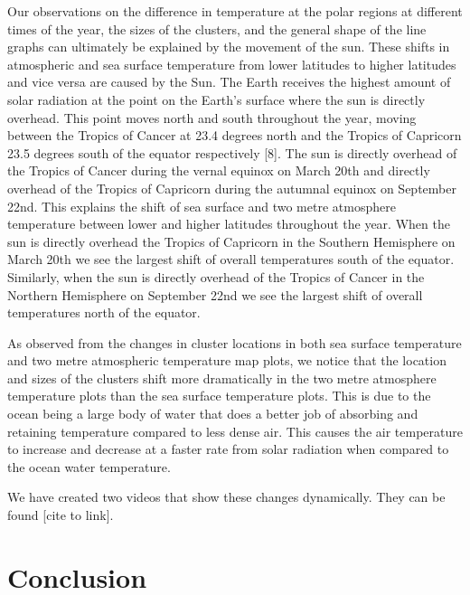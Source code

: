 \documentclass[conference,compsoc]{IEEEtran}
\begin{document}
Our observations on the difference in temperature at the polar regions at different times of the year, the sizes of the clusters, and the general shape of the line graphs can ultimately be explained by the movement of the sun. These shifts in atmospheric and sea surface temperature from lower latitudes to higher latitudes and vice versa are caused by the Sun. The Earth receives the highest amount of solar radiation at the point on the Earth's surface where the sun is directly overhead. This point moves north and south throughout the year, moving between the Tropics of Cancer at 23.4 degrees north and the Tropics of Capricorn 23.5 degrees south of the equator respectively [8]. The sun is directly overhead of the Tropics of Cancer during the vernal equinox on March 20th and directly overhead of the Tropics of Capricorn during the autumnal equinox on September 22nd. This explains the shift of sea surface and two metre atmosphere temperature between lower and higher latitudes throughout the year. When the sun is directly overhead the Tropics of Capricorn in the Southern Hemisphere on March 20th we see the largest shift of overall temperatures south of the equator. Similarly, when the sun is directly overhead of the Tropics of Cancer in the Northern Hemisphere on September 22nd we see the largest shift of overall temperatures north of the equator.

As observed from the changes in cluster locations in both sea surface temperature and two metre atmospheric temperature map plots, we notice that the location and sizes of the clusters shift more dramatically in the two metre atmosphere temperature plots than the sea surface temperature plots. This is due to the ocean being a large body of water that does a better job of absorbing and retaining temperature compared to less dense air. This causes the air temperature to increase and decrease at a faster rate from solar radiation when compared to the ocean water temperature.

We have created two videos that show these changes dynamically. They can be found [cite to link].

\section{Conclusion}
\end{document}
